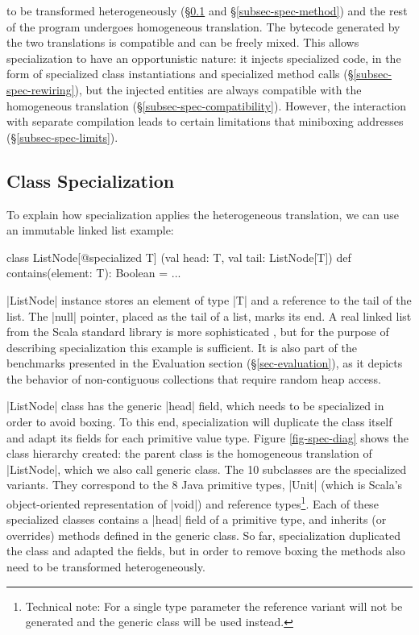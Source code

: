  to be transformed heterogeneously (\S\ref{subsec-spec-class} and \S\ref{subsec-spec-method}) and the rest of the program undergoes homogeneous translation. The bytecode generated by the two translations is compatible and can be freely mixed. This allows specialization to have an opportunistic nature: it injects specialized code, in the form of specialized class instantiations and specialized method calls (\S\ref{subsec-spec-rewiring}), but the injected entities are always compatible with the homogeneous translation (\S\ref{subsec-spec-compatibility}). However, the interaction with separate compilation leads to certain limitations that miniboxing addresses (\S\ref{subsec-spec-limits}).

\subsection{Class Specialization}
\label{subsec-spec-class}

To explain how specialization applies the heterogeneous translation, we can use an immutable linked list example:
\begin{lstlisting-nobreak}
 class ListNode[@specialized T]
          (val head: T, val tail: ListNode[T]) {
   def contains(element: T): Boolean = ...
 }
\end{lstlisting-nobreak}

 |ListNode| instance stores an element of type |T| and a reference to the tail of the list. The |null| pointer, placed as the tail of a list, marks its end. A real linked list from the Scala standard library is more sophisticated \cite{collections-alex, adriaan}, but for the purpose of describing specialization this example is sufficient. It is also part of the benchmarks presented in the Evaluation section (\S\ref{sec-evaluation}), as it depicts the behavior of non-contiguous collections that require random heap access. 

 |ListNode| class has the generic |head| field, which needs to be specialized in order to avoid boxing. To this end, specialization will duplicate the class itself and adapt its fields for each primitive value type. Figure \ref{fig-spec-diag} shows the class hierarchy created: the parent class is the homogeneous translation of |ListNode|, which we also call generic class. The 10 subclasses are the specialized variants. They correspond to the 8 Java primitive types, |Unit| (which is Scala's object-oriented representation of |void|) and reference types\footnote{Technical note: For a single type parameter the reference variant will not be generated and the generic class will be used instead.}. Each of these specialized classes contains a |head| field of a primitive type, and inherits (or overrides) methods defined in the generic class. So far, specialization duplicated the class and adapted the fields, but in order to remove boxing the methods also need to be transformed heterogeneously.

